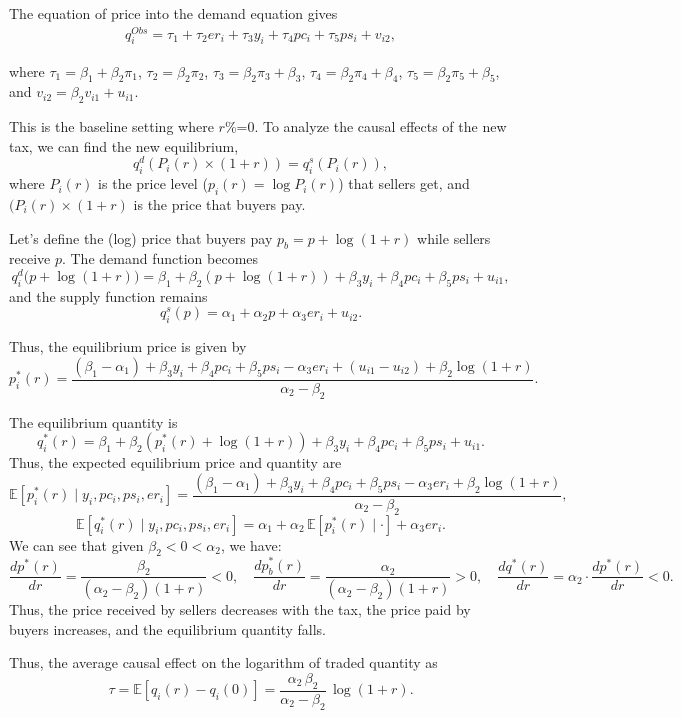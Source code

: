 The equation of price into the demand equation gives
\begin{align*}
	q_i^{Obs}=\tau_1+\tau_2 er_i + \tau_3 y_i + \tau_4 pc_i + \tau_5 ps_i + v_{i2},
\end{align*}

where $\tau_1=\beta_1+\beta_2\pi_1$, $\tau_2=\beta_2\pi_2$, $\tau_3=\beta_2\pi_3+\beta_3$, $\tau_4=\beta_2\pi_4+\beta_4$, $\tau_5=\beta_2\pi_5+\beta_5$, and $v_{i2}=\beta_2v_{i1}+u_{i1}$.

This is the baseline setting where $r$\%=0. To analyze the causal effects of the new tax, we can find the new equilibrium,
\[
q_i^d(P_i(r)\times (1+r))=q_i^s(P_i(r)),
\] 
where $P_i(r)$ is the price level ($p_i(r)=\log P_i(r)$) that sellers get, and $(P_i(r)\times (1+r)$ is the price that buyers pay.

Let's define the (log) price that buyers pay $p_b = p + \log(1+r)$ while sellers receive $p$. The demand function becomes
\[
q_i^d\big(p + \log(1+r)\big) = \beta_1 + \beta_2\left(p + \log(1+r)\right) + \beta_3 y_i + \beta_4 pc_i + \beta_5 ps_i + u_{i1},
\]
and the supply function remains
\[
q_i^s(p) = \alpha_1 + \alpha_2 p + \alpha_3 er_i + u_{i2}.
\]

Thus, the equilibrium price is given by
\[
p_i^*(r) = \frac{(\beta_1 - \alpha_1) + \beta_3 y_i + \beta_4 pc_i + \beta_5 ps_i - \alpha_3 er_i + (u_{i1} - u_{i2}) + \beta_2 \log(1+r)}{\alpha_2 - \beta_2}.
\]

The equilibrium quantity is
\[
q_i^*(r) = \beta_1 + \beta_2\left(p_i^*(r) + \log(1+r)\right) + \beta_3 y_i + \beta_4 pc_i + \beta_5 ps_i + u_{i1}.
\]
Thus, the expected equilibrium price and quantity are
\[
\mathbb{E}[p_i^*(r)\mid y_i, pc_i, ps_i, er_i]
=
\frac{(\beta_1 - \alpha_1) + \beta_3 y_i + \beta_4 pc_i + \beta_5 ps_i - \alpha_3 er_i + \beta_2 \log(1+r)}{\alpha_2 - \beta_2},
\]
\[
\mathbb{E}[q_i^*(r)\mid y_i, pc_i, ps_i, er_i]
=
\alpha_1 + \alpha_2 \,\mathbb{E}[p_i^*(r)\mid \cdot] + \alpha_3 er_i.
\]
We can see that given $\beta_2 < 0 < \alpha_2$, we have:
\[
\frac{d p^*(r)}{dr} = \frac{\beta_2}{(\alpha_2 - \beta_2)(1+r)} < 0, \quad
\frac{d p_b^*(r)}{dr} = \frac{\alpha_2}{(\alpha_2 - \beta_2)(1+r)} > 0, \quad
\frac{d q^*(r)}{dr} = \alpha_2 \cdot \frac{d p^*(r)}{dr} < 0.
\]
Thus, the price received by sellers decreases with the tax, the price paid by buyers increases, and the equilibrium quantity falls.
  
Thus, the average causal effect on the logarithm of traded quantity as
\[
\tau = \mathbb{E}[q_i(r) - q_i(0)]= \frac{\alpha_2 \, \beta_2}{\alpha_2 - \beta_2}\,\log(1+r).
\]

